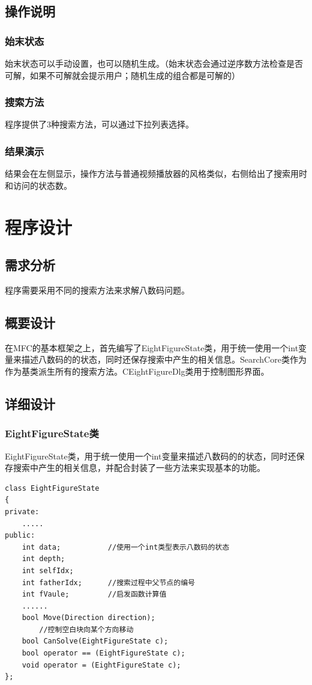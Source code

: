 \documentclass[12pt,a4paper]{article}
\begin{document}
\subsection{操作说明}
\subsubsection{始末状态}
始末状态可以手动设置，也可以随机生成。（始末状态会通过逆序数方法检查是否可解，如果不可解就会提示用户；随机生成的组合都是可解的）
\subsubsection{搜索方法}
程序提供了3种搜索方法，可以通过下拉列表选择。
\subsubsection{结果演示}
结果会在左侧显示，操作方法与普通视频播放器的风格类似，右侧给出了搜索用时和访问的状态数。
\section{程序设计}
\subsection{需求分析}
程序需要采用不同的搜索方法来求解八数码问题。
\subsection{概要设计}
在MFC的基本框架之上，首先编写了EightFigureState类，用于统一使用一个int变量来描述八数码的的状态，同时还保存搜索中产生的相关信息。SearchCore类作为作为基类派生所有的搜索方法。CEightFigureDlg类用于控制图形界面。
\subsection{详细设计}
\subsubsection{EightFigureState类}
EightFigureState类，用于统一使用一个int变量来描述八数码的的状态，同时还保存搜索中产生的相关信息，并配合封装了一些方法来实现基本的功能。
\begin{lstlisting}
class EightFigureState
{
private:
   	.....
public:
    int data;			//使用一个int类型表示八数码的状态
    int depth;
    int selfIdx;
    int fatherIdx;		//搜索过程中父节点的编号
    int fVaule;			//启发函数计算值
    ......
    bool Move(Direction direction);		
    	//控制空白块向某个方向移动
    bool CanSolve(EightFigureState c);
    bool operator == (EightFigureState c);
    void operator = (EightFigureState c);
};
\end{lstlisting}
\end{document}

